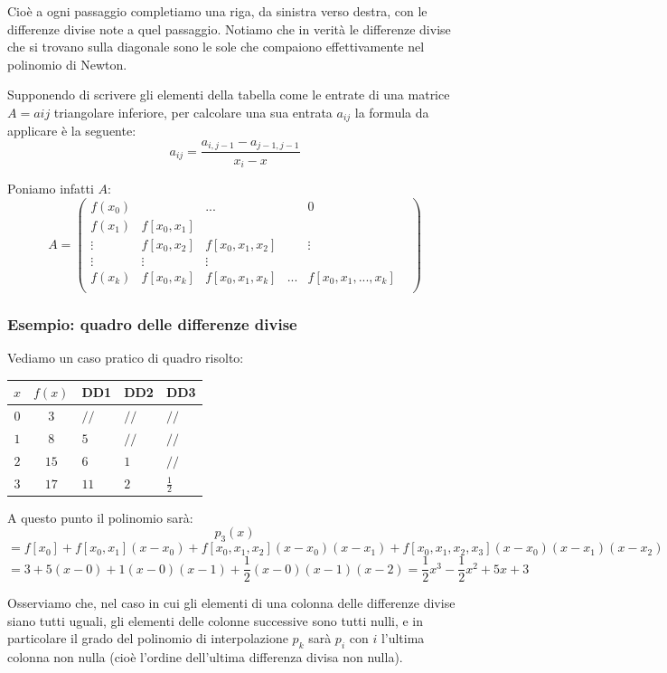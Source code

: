 \documentclass[a4paper,11pt]{article}
\begin{document}
Cioè a ogni passaggio completiamo una riga, da sinistra verso destra, con le differenze divise note a quel passaggio.
Notiamo che in verità le differenze divise che si trovano sulla diagonale sono le sole che compaiono effettivamente nel polinomio di Newton.

Supponendo di scrivere gli elementi della tabella come le entrate di una matrice $A = a{ij}$ triangolare inferiore, per calcolare una sua entrata $a_{ij}$ la formula da applicare è la seguente:
$$
a_{ij} = \frac{a_{i, j - 1} - a_{j - 1, j - 1}}{x_i - x}
$$

Poniamo infatti $A$:
$$
A = 
\begin{pmatrix}
	f(x_0) & & ... & & 0 \\
	f(x_1) & f[x_0, x_1] & & & & \\
	\vdots & f[x_0, x_2] & f[x_0, x_1, x_2] & & \vdots \\
	\vdots & \vdots & \vdots & & & \\
	f(x_k) &  f[x_0, x_k] & f[x_0, x_1, x_k] & ... & f[x_0, x_1, ..., x_k] \\
\end{pmatrix}
$$

\subsubsection{Esempio: quadro delle differenze divise}
Vediamo un caso pratico di quadro risolto:
\begin{table}[H]
	\center 
	\begin{tabular} { c | c | p{1cm}  p{1cm} p{1cm} }
		$x$ & $f(x)$ & DD1 & DD2 & DD3 \\
		\hline
		$0 $ & $ 3 $ & $ // $ & $ // $ & $ // $ \\
		$1 $ & $ 8 $ & $ 5 $ & $ // $ & $ // $ \\ 
		$2 $ & $ 15 $ & $ 6 $ & $ 1 $ & $ // $ \\
		$3 $ & $ 17 $ & $ 11 $ & $ 2 $ & $\frac{1}{2}$ \\
	\end{tabular}
\end{table}

A questo punto il polinomio sarà:
$$
p_3(x)
$$
$$
= f[x_0] + f[x_0, x_1] (x - x_0) + f[x_0, x_1, x_2] (x - x_0) (x - x_1) + f[x_0, x_1, x_2, x_3] (x - x_0) (x - x_1) (x - x_2) 
$$
$$
= 3 + 5 ( x - 0 ) + 1 ( x - 0 ) ( x - 1 ) + \frac{1}{2} ( x - 0 ) ( x - 1 ) ( x - 2 ) = \frac{1}{2}x^3 - \frac{1}{2}x^2 + 5x + 3
$$

Osserviamo che, nel caso in cui gli elementi di una colonna delle differenze divise siano tutti uguali, gli elementi delle colonne successive sono tutti nulli, e in particolare il grado del polinomio di interpolazione $p_k$ sarà $p_i$ con $i$ l'ultima colonna non nulla (cioè l'ordine dell'ultima differenza divisa non nulla). 
\end{document}
